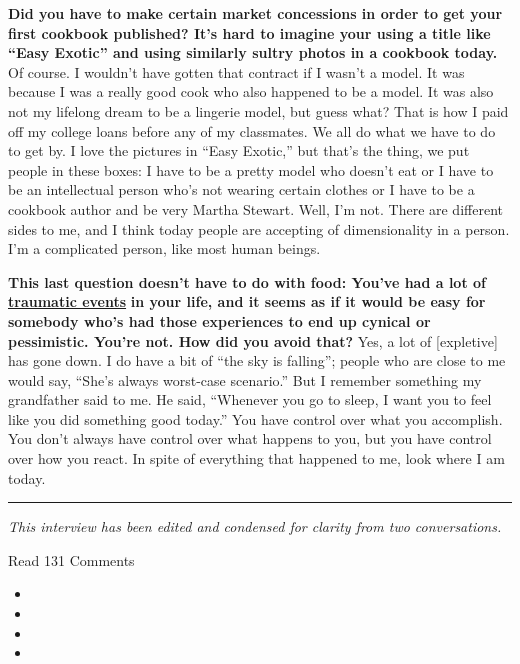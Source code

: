\textbf{Did you have to make certain market concessions in order to get
your first cookbook published? It's hard to imagine your using a title
like ``Easy Exotic'' and using similarly sultry photos in a cookbook
today.} Of course. I wouldn't have gotten that contract if I wasn't a
model. It was because I was a really good cook who also happened to be a
model. It was also not my lifelong dream to be a lingerie model, but
guess what? That is how I paid off my college loans before any of my
classmates. We all do what we have to do to get by. I love the pictures
in ``Easy Exotic,'' but that's the thing, we put people in these boxes:
I have to be a pretty model who doesn't eat or I have to be an
intellectual person who's not wearing certain clothes or I have to be a
cookbook author and be very Martha Stewart. Well, I'm not. There are
different sides to me, and I think today people are accepting of
dimensionality in a person. I'm a complicated person, like most human
beings.

\textbf{This last question doesn't have to do with food: You've had a
lot of} \textbf{\href{http://nytimes.com\#tooltip-12}{traumatic events}}
\textbf{in your life, and it seems as if it would be easy for somebody
who's had those experiences to end up cynical or pessimistic. You're
not. How did you avoid that?} Yes, a lot of {[}expletive{]} has gone
down. I do have a bit of ``the sky is falling''; people who are close to
me would say, ``She's always worst-case scenario.'' But I remember
something my grandfather said to me. He said, ``Whenever you go to
sleep, I want you to feel like you did something good today.'' You have
control over what you accomplish. You don't always have control over
what happens to you, but you have control over how you react. In spite
of everything that happened to me, look where I am today.

\begin{center}\rule{0.5\linewidth}{\linethickness}\end{center}

\emph{This interview has been edited and condensed for clarity from two
conversations.}

Read 131 Comments

\begin{itemize}
\item
\item
\item
\item
\end{itemize}

